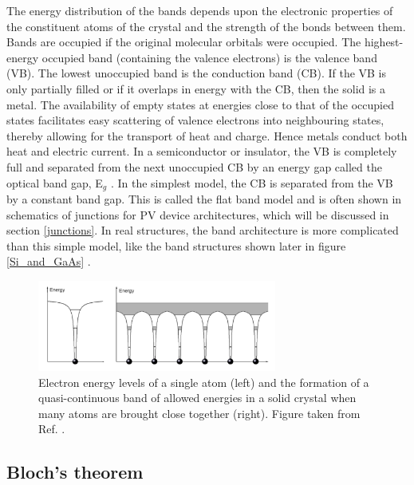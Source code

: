 \documentclass[11pt, twoside]{report}
\begin{document}
The energy distribution of the bands depends upon the electronic properties of the constituent atoms of the crystal and the strength of the bonds between them. Bands are occupied if the original molecular orbitals were occupied. The highest-energy occupied band (containing the valence electrons) is the valence band (VB). The lowest unoccupied band is the conduction band (CB). If the VB is only partially filled or if it overlaps in energy with the CB, then the solid is a metal. The availability of empty states at energies close to that of the occupied states facilitates easy scattering of valence electrons into neighbouring states, thereby allowing for the transport of heat and charge. Hence metals conduct both heat and electric current. In a semiconductor or insulator, the VB is completely full and separated from the next unoccupied CB by an energy gap called the optical band gap, E$_g$ \cite{Nelson3}. In the simplest model, the CB is separated from the VB by a constant band gap. This is called the flat band model and is often shown in schematics of junctions for PV device architectures, which will be discussed in section \ref{junctions}. In real structures, the band architecture is more complicated than this simple model, like the band structures shown later in figure \ref{Si_and_GaAs} \cite{Tilley}.

\begin{figure}[h!]
  \centering
    \includegraphics[width=0.7\textwidth]{figures/band_Elevels.png}
    \caption[Electron energy levels of a single atom (left) and the formation of a quasi-continuous band of allowed energies in a solid crystal when many atoms are brought close together (right).]{Electron energy levels of a single atom (left) and the formation of a quasi-continuous band of allowed energies in a solid crystal when many atoms are brought close together (right). Figure taken from Ref. .}
  \label{band_Elevels}
\end{figure}

\subsection{Bloch's theorem}
\end{document}
